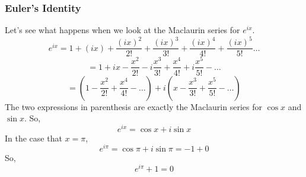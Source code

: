 \subsubsection{Euler's Identity}
\noindent
Let's see what happens when we look at the Maclaurin series for $e^{ix}$.
\begin{equation*}
	e^{ix} = 1 + (ix) + \frac{(ix)^2}{2!} + \frac{(ix)^3}{3!} + \frac{(ix)^4}{4!} + \frac{(ix)^5}{5!} \ldots
\end{equation*}
\begin{equation*}
	= 1 + ix - \frac{x^2}{2!} - i\frac{x^3}{3!} + \frac{x^4}{4!} + i\frac{x^5}{5!} - \ldots
\end{equation*}
\begin{equation*}
	= \left(1 - \frac{x^2}{2!} + \frac{x^4}{4!} - \ldots \right) + i\left(x - \frac{x^3}{3!} + \frac{x^5}{5!} - \ldots \right)
\end{equation*}
The two expressions in parenthesis are exactly the Maclaurin series for $\cos{x}$ and $\sin{x}$. So,
\begin{equation*}
	e^{ix} = \cos{x} + i\sin{x}
\end{equation*}
In the case that $x = \pi$,
\begin{equation*}
	e^{i\pi} = \cos{\pi} + i\sin{\pi} = -1 + 0
\end{equation*}
So,
\begin{equation*}
	e^{i\pi} + 1 = 0
\end{equation*}
